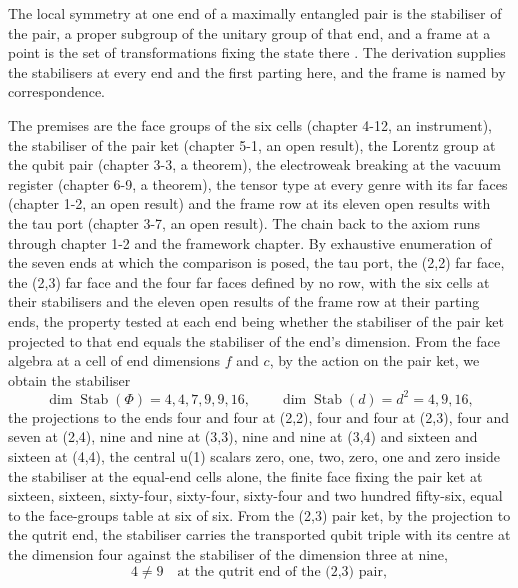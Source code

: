 \begin{chbridge}
The local symmetry at one end of a maximally entangled pair is the stabiliser of the pair, a proper subgroup of the unitary group of that end, and a frame at a point is the set of transformations fixing the state there \cite{Werner1989,Wigner1939}. The derivation supplies the stabilisers at every end and the first parting here, and the frame is named by correspondence.
\end{chbridge}
\begin{chproof}
The premises are the face groups of the six cells (chapter 4-12, an instrument), the stabiliser of the pair ket (chapter 5-1, an open result), the Lorentz group at the qubit pair (chapter 3-3, a theorem), the electroweak breaking at the vacuum register (chapter 6-9, a theorem), the tensor type at every genre with its far faces (chapter 1-2, an open result) and the frame row at its eleven open results with the tau port (chapter 3-7, an open result). The chain back to the axiom runs through chapter 1-2 and the framework chapter. By exhaustive enumeration of the seven ends at which the comparison is posed, the tau port, the (2,2) far face, the (2,3) far face and the four far faces defined by no row, with the six cells at their stabilisers and the eleven open results of the frame row at their parting ends, the property tested at each end being whether the stabiliser of the pair ket projected to that end equals the stabiliser of the end's dimension. From the face algebra at a cell of end dimensions $f$ and $c$, by the action on the pair ket, we obtain the stabiliser
\begin{equation}
\dim \operatorname{Stab}(\Phi) = 4, 4, 7, 9, 9, 16 , \qquad \dim \operatorname{Stab}(d) = d^{2} = 4, 9, 16 ,
\end{equation}
the projections to the ends four and four at (2,2), four and four at (2,3), four and seven at (2,4), nine and nine at (3,3), nine and nine at (3,4) and sixteen and sixteen at (4,4), the central u(1) scalars zero, one, two, zero, one and zero inside the stabiliser at the equal-end cells alone, the finite face fixing the pair ket at sixteen, sixteen, sixty-four, sixty-four, sixty-four and two hundred fifty-six, equal to the face-groups table at six of six. From the (2,3) pair ket, by the projection to the qutrit end, the stabiliser carries the transported qubit triple with its centre at the dimension four against the stabiliser of the dimension three at nine,
\begin{equation}
4 \neq 9 \quad \text{at the qutrit end of the (2,3) pair} ,

\end{equation}
\end{chproof}
